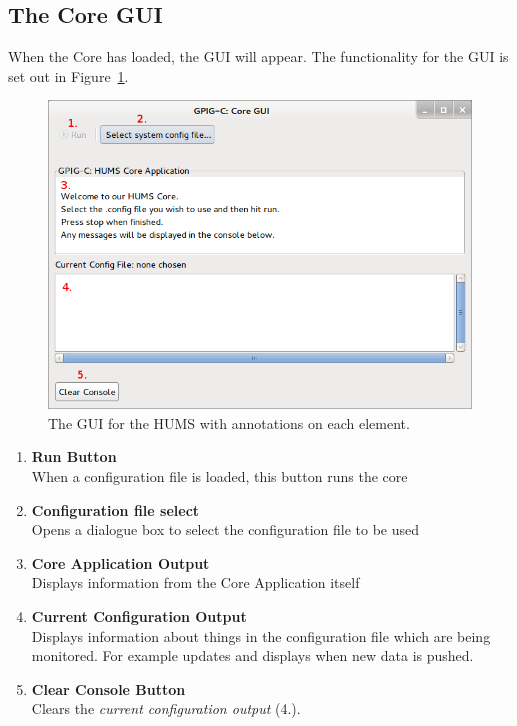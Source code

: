 \documentclass[10pt,a4paper]{article}
\begin{document}
\subsection{The Core GUI}
\label{sec:core}
When the Core has loaded, the GUI will appear. The functionality for the GUI is set out in Figure~\ref{fig:manualgui}.
\begin{figure}[H]
  \centering
  \includegraphics[width=\textwidth]{images/manual-gui.png}
  \caption{The GUI for the HUMS with annotations on each element.}
  \label{fig:manualgui}
\end{figure}
\begin{enumerate}
\item \textbf{Run Button} \\ 
When a configuration file is loaded, this button runs the core
\item \textbf{Configuration file select} \\ 
Opens a dialogue box to select the configuration file to be used
\item \textbf{Core Application Output} \\ 
Displays information from the Core Application itself
\item \textbf{Current Configuration Output} \\ 
Displays information about things in the configuration file which are being monitored. For example updates and displays when new data is pushed.
\item \textbf{Clear Console Button} \\ 
Clears the \emph{current configuration output} (4.).
\end{enumerate}
\end{document}
